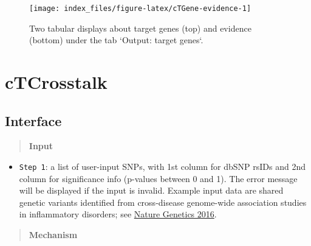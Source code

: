 \documentclass[
  oneside]{book}
\providecommand{\tightlist}{%
  \setlength{\itemsep}{0pt}\setlength{\parskip}{0pt}}
\begin{document}
\begin{figure}

{\centering \texttt{[image: index\_files/figure-latex/cTGene-evidence-1]} 

}

\caption{Two tabular displays about target genes (top) and evidence (bottom) under the tab `Output: target genes`.}\label{fig:cTGene-evidence}
\end{figure}

\hypertarget{ctcrosstalk}{%
\chapter{cTCrosstalk}\label{ctcrosstalk}}

\hypertarget{interface-4}{%
\section{Interface}\label{interface-4}}

\begin{quote}
\textbf{Input}
\end{quote}

\begin{itemize}
\tightlist
\item
  \texttt{Step\ 1}: a list of user-input SNPs, with 1st column for dbSNP rsIDs and 2nd column for significance info (p-values between 0 and 1). The error message will be displayed if the input is invalid. Example input data are shared genetic variants identified from cross-disease genome-wide association studies in inflammatory disorders; see \href{https://www.ncbi.nlm.nih.gov/pubmed/26974007}{Nature Genetics 2016}.
\end{itemize}

\begin{quote}
\textbf{Mechanism}
\end{quote}
\end{document}
